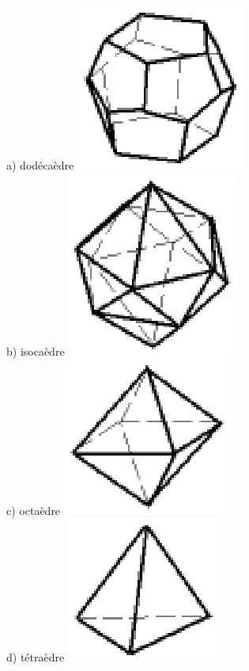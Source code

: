 \documentclass[letterpaper, 12pt]{article}
\begin{document}
a) dod\'eca\`edre
\includegraphics[scale=0.25]{polydode.eps}\\
b) isoca\`edre
\includegraphics[scale=0.25]{polyiso.eps}\\
c) octa\`edre
\includegraphics[scale=0.25]{polyocta.eps}\\
d) t\'etra\`edre
\includegraphics[scale=0.25]{polytetra.eps}\\
\end{document}
